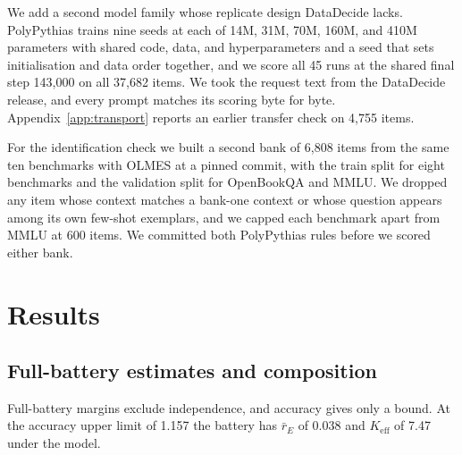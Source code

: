 \documentclass{article}
\begin{document}
We add a second model family whose replicate design DataDecide lacks. PolyPythias \citep{vanderwal2025} trains nine seeds at each of 14M, 31M, 70M, 160M, and 410M parameters with shared code, data, and hyperparameters and a seed that sets initialisation and data order together, and we score all 45 runs at the shared final step 143,000 on all 37,682 items. We took the request text from the DataDecide release, and every prompt matches its scoring byte for byte. Appendix~\ref{app:transport} reports an earlier transfer check on 4,755 items.

For the identification check we built a second bank of 6,808 items from the same ten benchmarks with OLMES at a pinned commit, with the train split for eight benchmarks and the validation split for OpenBookQA and MMLU. We dropped any item whose context matches a bank-one context or whose question appears among its own few-shot exemplars, and we capped each benchmark apart from MMLU at 600 items. We committed both PolyPythias rules before we scored either bank.

\section{Results}
\subsection{Full-battery estimates and composition}
\label{sec:composition}
Full-battery margins exclude independence, and accuracy gives only a bound. At the accuracy upper limit of 1.157 the battery has $\bar r_E$ of 0.038 and $K_{\mathrm{eff}}$ of 7.47 under the model.
\end{document}
